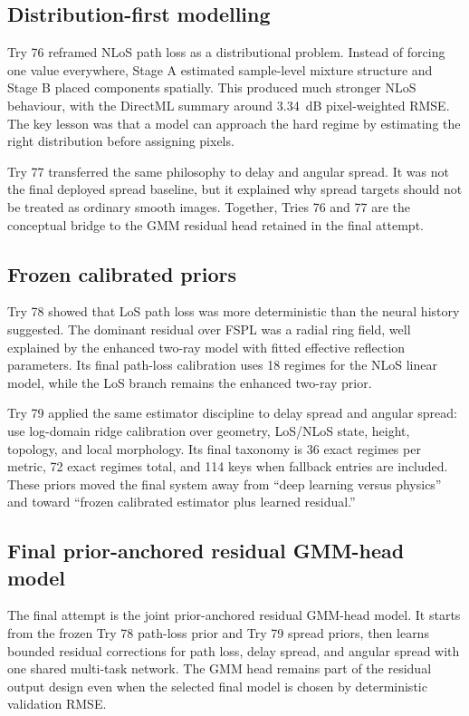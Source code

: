 \subsection{Distribution-first modelling}

Try 76 reframed NLoS path loss as a distributional problem. Instead of forcing
one value everywhere, Stage A estimated sample-level mixture structure and
Stage B placed components spatially. This produced much stronger NLoS
behaviour, with the DirectML summary around \SI{3.34}{dB} pixel-weighted RMSE.
The key lesson was that a model can approach the hard regime by estimating the
right distribution before assigning pixels.

Try 77 transferred the same philosophy to delay and angular spread. It was
not the final deployed spread baseline, but it explained why spread targets
should not be treated as ordinary smooth images. Together, Tries 76 and 77 are
the conceptual bridge to the GMM residual head retained in the final attempt.

\subsection{Frozen calibrated priors}

Try 78 showed that LoS path loss was more deterministic than the neural
history suggested. The dominant residual over FSPL was a radial ring field,
well explained by the enhanced two-ray model with fitted effective reflection
parameters. Its final path-loss calibration uses 18 regimes for the NLoS
linear model, while the LoS branch remains the enhanced two-ray prior.

Try 79 applied the same estimator discipline to delay spread and angular
spread: use log-domain ridge calibration over geometry, LoS/NLoS state,
height, topology, and local morphology. Its final taxonomy is 36 exact regimes
per metric, 72 exact regimes total, and 114 keys when fallback entries are
included. These priors moved the final system away from ``deep learning versus
physics'' and toward ``frozen calibrated estimator plus learned residual.''

\subsection{Final prior-anchored residual GMM-head model}

The final attempt is the joint prior-anchored residual GMM-head model. It starts from
the frozen Try 78 path-loss prior and Try 79 spread priors, then learns
bounded residual corrections for path loss, delay spread, and angular spread
with one shared multi-task network. The GMM head remains part of the residual
output design even when the selected final model is chosen by deterministic
validation RMSE.

